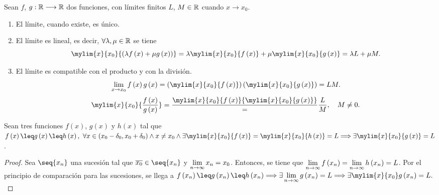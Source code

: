 \begin{prop}
    Sean $f$, $g : \mathbb{R}\longrightarrow \mathbb{R}$ dos funciones, con límites finitos $L$, $M\in \mathbb{R}$ cuando $x\longrightarrow x_0$.
    \begin{enumerate}[itemsep = -2pt]
        \item El límite, cuando existe, es único.
        \item El límite es lineal, es decir, $\forall \lambda, \mu\in\mathbb{R}$ se tiene
            \begin{equation}
                \mylim{x}{x_0}{\left( \lambda f\left( x \right) + \mu g\left( x \right)  \right) } =
                \lambda\mylim{x}{x_0}{f\left( x \right) } + \mu\mylim{x}{x_0}{g\left( x \right) } =
                \lambda L + \mu M.
            \end{equation}
        \item El límite es compatible con el producto y con la división.
            \begin{equation}
                \lim_{x\to x_0} f\left( x \right) g\left( x \right) = \left( \mylim{x}{x_0}{f\left( x \right) } \right) \left( \mylim{x}{x_0}{g\left( x \right) } \right) = LM.
            \end{equation}
            \begin{equation}
                \mylim{x}{x_0}{\frac{f\left( x \right) }{g\left( x \right) }} = \frac{\mylim{x}{x_0}{f\left( x \right) }{\mylim{x}{x_0}{g\left( x \right) }}} = \frac{L}{M},\quad M\neq 0.
            \end{equation}
    \end{enumerate}
\end{prop}

\begin{theorem}
    Sean tres funciones $f\left( x \right) $, $g\left( x \right) $ y $h\left( x \right) $ tal que $f\left( x \right) \leq g\left( x \right) \leq h\left( x \right),\ \forall x\in \left( x_0 - \delta_0, x_0 + \delta_0 \right) \land x\neq x_0\land \exists\mylim{x}{x_0}{f\left( x \right) } = \mylim{x}{x_0}{h\left( x \right)} = L \implies \exists \mylim{x}{x_0}{g\left( x \right) } = L$.
\end{theorem}

\begin{proof}
    Sea $\seq{x_n}$ una sucesión tal que $\conj{x_0}\in\seq{x_n}$ y $\liminft{n} x_n = x_0$. Entonces, se tiene que
    $\liminft{n} f\left( x_n \right) = \liminft{n} h\left( x_n \right) = L$. Por el principio de comparación
    para las sucesiones, se llega a $f\left( x_n \right) \leq g\left( x_n \right) \leq h\left( x_n \right) 
    \implies \exists\liminft{n} g\left( x_n \right) = L\implies \exists \mylim{x}{x_0} g\left( x_n \right) = L.$
\end{proof}


